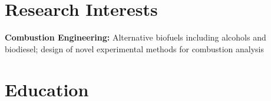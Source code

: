 %
%

\section{Research Interests}
{\bf Combustion Engineering:} Alternative biofuels including alcohols and biodiesel; design of novel experimental methods for combustion analysis

\section{Education}

